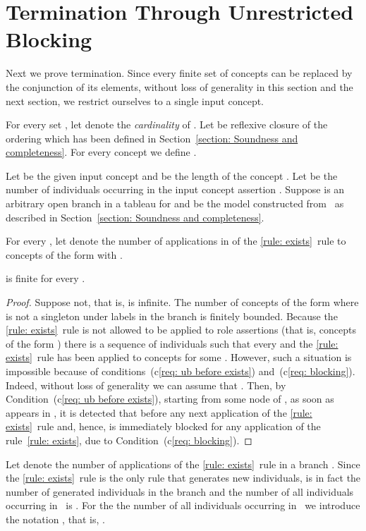 \documentclass[leqno
,pdflatex
,prodmode
,acmtocl
]{acmsmall}
\begin{document}
\section{Termination Through Unrestricted Blocking}
\label{section_termination}

Next we prove termination.
Since every finite set of concepts can be replaced by the conjunction
of its elements, without loss of generality in this section and the
next section, we restrict ourselves to a single input concept.

For every set , let  denote the \emph{cardinality} of . 
Let  be reflexive closure of the ordering  which has been defined in Section~\ref{section: Soundness and completeness}.
For every concept  we define .

Let  be the given input concept and  be the length of the concept . Let  be the number of individuals occurring in the input concept assertion .
Suppose  is an arbitrary open branch in a  tableau
for  and  be the model constructed
from~ as described in Section~\ref{section: Soundness and completeness}.

For every , let 
denote the number of applications in  of the \eqref{rule: exists}~rule
to concepts of the form 
with .

\begin{lemma}\label{lemma: napplE(ell)}
 is finite for every .
\end{lemma}
\begin{proof}
Suppose not, that is,  is infinite.
The number of concepts of the form 
where  is not a singleton under labels in the branch is finitely bounded.
Because the \eqref{rule: exists}~rule
is not allowed to be applied to
role assertions (that is, concepts of the form )
there is a sequence of individuals
 such that every
 and
the \eqref{rule: exists}~rule has been applied
to concepts 
for some .
However, such a situation is impossible because of
conditions~(c\ref{req: ub before exists}) and~(c\ref{req: blocking}).
Indeed, without loss of generality we can assume that .
Then, 
by Condition~(c\ref{req: ub before exists}),
starting from some node of ,
as soon as  appears in ,
it is detected that 
before any next
application of the \eqref{rule: exists}~rule
and, hence,  is immediately blocked for any application
of the rule~\eqref{rule: exists}, due to Condition~(c\ref{req: blocking}).
\end{proof}

Let  denote the number of applications
of the \eqref{rule: exists}~rule
in a branch .
Since the \eqref{rule: exists}~rule is the
only rule that generates new individuals, 
 is in fact the number of generated
individuals in the branch 
and the number of all individuals occurring in~ 
is .
For the the number of all individuals occurring in~
we introduce the notation 
, that is, .
\end{document}

